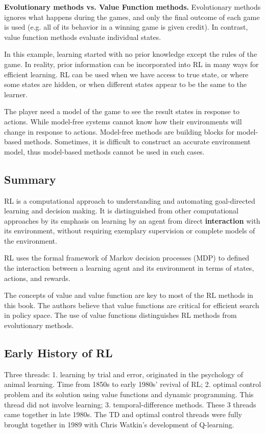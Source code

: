 \documentclass[lang=en,mode=geye,device=normal,color=blue,14pt]{elegantnote}
\DeclareMathOperator*{\1}{\mathbbm{1}}
\begin{document}
\textbf{Evolutionary methods vs. Value Function methods.} Evolutionary methods ignores what happens during the games, and only the final outcome of each game is used (e.g. all of its behavior in a winning game is given credit). In contrast, value function methods evaluate individual states.

In this example, learning started with no prior knowledge except the rules of the game. In reality, prior information can be incorporated into RL in many ways for efficient learning.
RL can be used when we have access to true state, or where some states are hidden, or when different states appear to be the same to the learner.

The player need a model of the game to see the result states in response to actions. While model-free systems cannot know how their environments will change in response to actions.
Model-free methods are building blocks for model-based methods.
Sometimes, it is difficult to construct an accurate environment model, thus model-based methods cannot be used in such cases.

\subsection{Summary}

RL is a computational approach to understanding and automating goal-directed learning and decision making.
It is distinguished from other computational approaches by its emphasis on learning by an agent from direct \textbf{interaction} with its environment, without requiring exemplary supervision or complete models of the environment.

RL uses the formal framework of Markov decision processes (MDP) to defined the interaction between a learning agent and its environment in terms of states, actions, and rewards.

The concepts of value and value function are key to most of the RL methods in this book.
The authors believe that value functions are critical for efficient search in policy space.
The use of value functions distinguishes RL methods from evolutionary methods.

\subsection{Early History of RL}

Three threads: 
1. learning by trial and error, originated in the psychology of animal learning. Time from 1850s to early 1980s' revival of RL;
2. optimal control problem and its solution using value functions and dynamic programming. This thread did not involve learning;
3. temporal-difference methods.
These 3 threads came together in late 1980s.
The TD and optimal control threads were fully brought together in 1989 with Chris Watkin's development of Q-learning.
\end{document}
